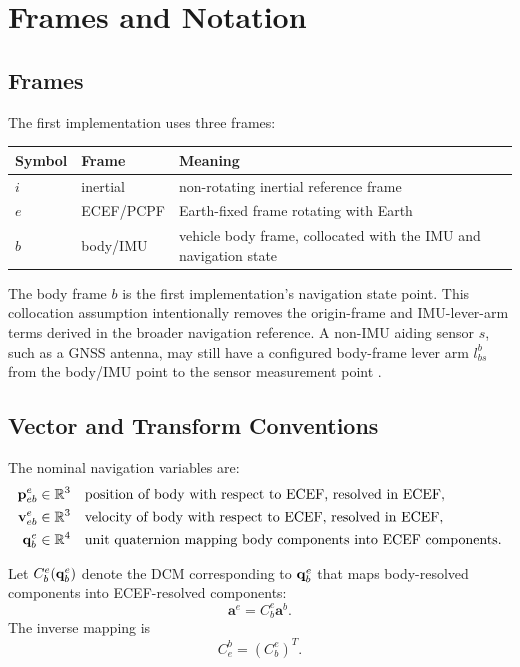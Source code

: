 \chapter{Frames and Notation}

\section{Frames}

The first implementation uses three frames:

\begin{center}
\begin{tabular}{lll}
\toprule
Symbol & Frame & Meaning \\
\midrule
$i$ & inertial & non-rotating inertial reference frame \\
$e$ & ECEF/PCPF & Earth-fixed frame rotating with Earth \\
$b$ & body/IMU & vehicle body frame, collocated with the IMU and navigation state \\
\bottomrule
\end{tabular}
\end{center}

The body frame $b$ is the first implementation's navigation state point. This
collocation assumption intentionally removes the origin-frame and IMU-lever-arm
terms derived in the broader navigation reference. A non-IMU aiding sensor
$s$, such as a GNSS antenna, may still have a configured body-frame lever arm
$l_{bs}^{b}$ from the body/IMU point to the sensor measurement point
\cite{groves2013}.

\section{Vector and Transform Conventions}

The nominal navigation variables are:
\begin{align}
\mathbf{p}_{eb}^{e} &\in \mathbb{R}^3 && \text{position of body with respect to ECEF, resolved in ECEF},\\
\mathbf{v}_{eb}^{e} &\in \mathbb{R}^3 && \text{velocity of body with respect to ECEF, resolved in ECEF},\\
\mathbf{q}_b^e &\in \mathbb{R}^4 && \text{unit quaternion mapping body components into ECEF components}.
\end{align}

Let $C_b^e(\mathbf{q}_b^e)$ denote the DCM corresponding to $\mathbf{q}_b^e$ that maps
body-resolved components into ECEF-resolved components:
\begin{equation}
\mathbf{a}^{e}=C_b^e\mathbf{a}^{b}.
\end{equation}
The inverse mapping is
\begin{equation}
C_e^b=\left(C_b^e\right)^{T}.
\end{equation}

